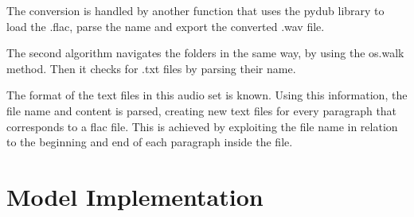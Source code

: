 

The conversion is handled by another function that uses the pydub library to load the .flac, parse the name and   export the converted .wav file.



The second algorithm navigates the folders in the same way, by using the os.walk method. Then it checks for .txt files by parsing their name. 



The format of the text files in this audio set is known. Using this information, the file name and content is parsed, creating new text files for every paragraph that corresponds to a flac file. This is achieved by exploiting the file name in relation to the beginning and end of each paragraph inside the file.
 
 
 
\section{Model Implementation}

